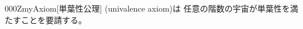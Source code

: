 \documentclass[index]{subfiles}
\begin{document}
\begin{myBlock}{000Z}{myAxiom}[単葉性公理]
  (univalence axiom)は
  任意の階数の宇宙が単葉性を満たすことを要請する。
\end{myBlock}
\end{document}
